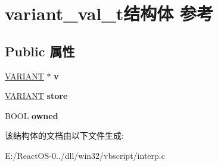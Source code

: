 \hypertarget{structvariant__val__t}{}\section{variant\+\_\+val\+\_\+t结构体 参考}
\label{structvariant__val__t}
\subsection*{Public 属性}
\begin{DoxyCompactItemize}
\item 
\mbox{\label{structvariant__val__t_ae41ed7010d9a32ba697160c3558451aa}} 
\hyperlink{structtag_v_a_r_i_a_n_t}{V\+A\+R\+I\+A\+NT} $\ast$ {\bfseries v}
\item 
\mbox{\label{structvariant__val__t_aad0472c6b5e6f7a951b10844ad7d0e06}} 
\hyperlink{structtag_v_a_r_i_a_n_t}{V\+A\+R\+I\+A\+NT} {\bfseries store}
\item 
\mbox{\label{structvariant__val__t_a308f33c83535efa0e40201034c016b03}} 
B\+O\+OL {\bfseries owned}
\end{DoxyCompactItemize}


该结构体的文档由以下文件生成\+:\begin{DoxyCompactItemize}
\item 
E\+:/\+React\+O\+S-\/0../dll/win32/vbscript/interp.\+c\end{DoxyCompactItemize}
